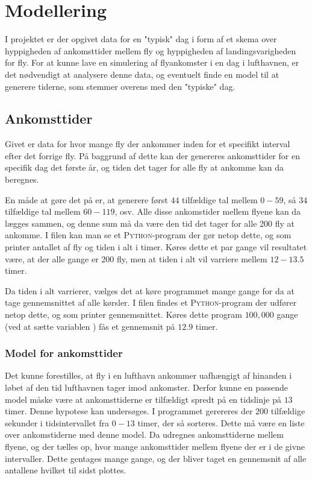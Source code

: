 \chapter{Modellering}
I projektet er der opgivet data for en "typisk" dag i form af et skema over hyppigheden af ankomsttider mellem fly og hyppigheden af landingsvarigheden for fly. For at kunne lave en simulering af flyankomster i en dag i lufthavnen, er det nødvendigt at analysere denne data, og eventuelt finde en model til at generere tiderne, som stemmer overens med den "typiske" dag.
\section{Ankomsttider}
Givet er data for hvor mange fly der ankommer inden for et specifikt interval efter det forrige fly. På baggrund af dette kan der genereres ankomsttider for en specifik dag det første år, og tiden det tager for alle fly at ankomme kan da beregnes.

En måde at gøre det på er, at generere først $44$ tilfældige tal mellem $0 - 59$, så $34$ tilfældige tal mellem $60 - 119$, osv. Alle disse ankomstider mellem flyene kan da lægges sammen, og denne sum må da være den tid det tager for alle 200 fly at ankomme.
I filen  kan man se et \textsc{Python}-program der gør netop dette, og som printer antallet af fly og tiden i alt i timer.
Køres dette et par gange vil resultatet være, at der alle gange er 200 fly, men at tiden i alt vil varriere mellem $12 - 13.5$ timer.

Da tiden i alt varrierer, vælges det at køre programmet mange gange for da at tage gennemsnittet af alle kørsler.
I filen  findes et \textsc{Python}-program der udfører netop dette, og som printer gennemsnittet. Køres dette program $100,000$ gange (ved at sætte variablen ) fås et gennemsnit på $12.9$ timer.

\subsection{Model for ankomsttider} \label{chap:model_arrival_times}
Det kunne forestilles, at fly i en lufthavn ankommer uafhængigt af hinanden i løbet af den tid lufthavnen tager imod ankomster.
Derfor kunne en passende model måske være at ankomsttiderne er tilfældigt spredt på en tidslinje på $13$ timer.
Denne hypotese kan undersøges.
I programmet  gerereres der $200$ tilfældige sekunder i tidsintervallet fra $0 - 13$ timer, der så sorteres. Dette må være en liste over ankomstiderne med denne model.
Da udregnes ankomsttiderne mellem flyene, og der tælles op, hvor mange ankomsttider mellem flyene der er i de givne intervaller.
Dette gentages mange gange, og der bliver taget en gennemsnit af alle antallene hvilket til sidst plottes.

